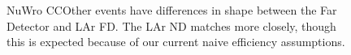 \documentclass[12pt]{article}
\begin{document}
\begin{figure}[h]
\endminipage
\caption{NuWro CCOther events have differences in shape between the Far Detector and LAr FD. The LAr ND matches more closely, though this is expected because of our current naive efficiency assumptions.}
\label{fig:numubar_Etrue_ereco_CCOther_diffs}
\end{figure}
\FloatBarrier






\end{document}
